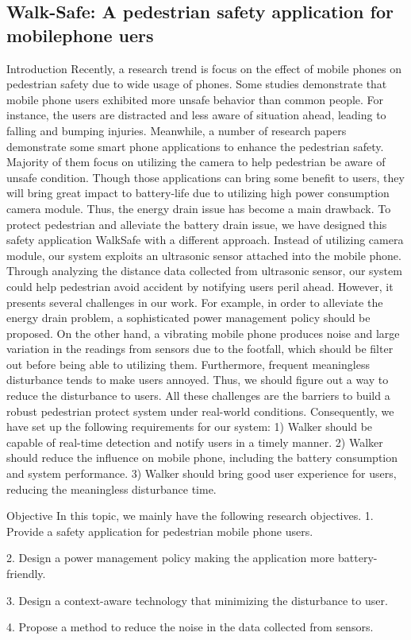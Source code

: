 \subsection{Walk-Safe: A pedestrian safety application for mobilephone uers}

Introduction
Recently, a research trend is focus on the effect of mobile phones on pedestrian safety due to wide usage of phones. Some studies demonstrate that mobile phone users exhibited more unsafe behavior than common people. For instance, the users are distracted and less aware of situation ahead, leading to falling and bumping injuries. Meanwhile, a number of research papers demonstrate some smart phone applications to enhance the pedestrian safety. Majority of them focus on utilizing the camera to help pedestrian be aware of unsafe condition. Though those applications can bring some benefit to users, they will bring great impact to battery-life due to utilizing high power consumption camera module. Thus, the energy drain issue has become a main drawback. To protect pedestrian and alleviate the battery drain issue, we have designed this safety application WalkSafe with a different approach. Instead of utilizing camera module, our system exploits an ultrasonic sensor attached into the mobile phone. Through analyzing the distance data collected from ultrasonic sensor, our system could help pedestrian avoid accident by notifying users peril ahead.
However, it presents several challenges in our work. For example, in order to alleviate the energy drain problem, a sophisticated power management policy should be proposed. On the other hand, a vibrating mobile phone produces noise and large variation in the readings from sensors due to the footfall, which should be filter out before being able to utilizing them. Furthermore, frequent meaningless disturbance tends to make users annoyed. Thus, we should figure out a way to reduce the disturbance to users. All these challenges are the barriers to build a robust pedestrian protect system under real-world conditions.
Consequently, we have set up the following requirements for our system: 1) Walker should be capable of real-time detection and notify users in a timely manner. 2) Walker should reduce the influence on mobile phone, including the battery consumption and system performance. 3) Walker should bring good user experience for users, reducing the meaningless disturbance time.

Objective
In this topic, we mainly have the following research objectives.
1.     Provide a safety application for pedestrian mobile phone users.

2.     Design a power management policy making the application more battery-friendly.

3.     Design a context-aware technology that minimizing the disturbance to user.

4.     Propose a method to reduce the noise in the data collected from sensors. 